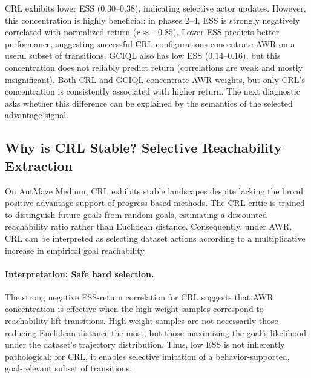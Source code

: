 CRL exhibits lower ESS (\(0.30\)--\(0.38\)), indicating selective actor updates. However, this concentration is highly beneficial: in phases 2--4, ESS is strongly negatively correlated with normalized return (\(r \approx -0.85\)). Lower ESS predicts better performance, suggesting successful CRL configurations concentrate AWR on a useful subset of transitions. GCIQL also has low ESS (\(0.14\)--\(0.16\)), but this concentration does not reliably predict return (correlations are weak and mostly insignificant).
Both CRL and GCIQL concentrate AWR weights, but only CRL's concentration is consistently associated with higher return.
The next diagnostic asks whether this difference can be explained by the semantics of the selected advantage signal.


\subsection{Why is CRL Stable? Selective Reachability Extraction}
\label{sec:experiments:crl}

On AntMaze Medium, CRL exhibits stable landscapes despite lacking the broad positive-advantage support of progress-based methods.
The CRL critic is trained to distinguish future goals from random goals, estimating a discounted reachability ratio rather than Euclidean distance.
Consequently, under AWR, CRL can be interpreted as selecting dataset actions according to a multiplicative increase in empirical goal reachability.

\paragraph{Interpretation: Safe hard selection.}
The strong negative ESS-return correlation for CRL suggests that AWR concentration is effective when the high-weight samples correspond to reachability-lift transitions.
High-weight samples are not necessarily those reducing Euclidean distance the most, but those maximizing the goal's likelihood under the dataset's trajectory distribution.
Thus, low ESS is not inherently pathological; for CRL, it enables selective imitation of a behavior-supported, goal-relevant subset of transitions.

